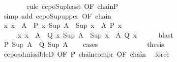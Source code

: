 \begin{isabellebody}
\ \ \ \ \ \ \isamarkupfalse%
\ {\isacharparenleft}{\kern0pt}rule\ ccpo{\isacharunderscore}{\kern0pt}Sup{\isacharunderscore}{\kern0pt}least\ {\isacharbrackleft}{\kern0pt}OF\ chain{\isacharunderscore}{\kern0pt}P{\isacharbrackright}{\kern0pt}{\isacharparenright}{\kern0pt}\isanewline
\ \ \ \ \ \ \isamarkupfalse%
\ {\isacharparenleft}{\kern0pt}simp\ add{\isacharcolon}{\kern0pt}\ ccpo{\isacharunderscore}{\kern0pt}Sup{\isacharunderscore}{\kern0pt}upper\ {\isacharbrackleft}{\kern0pt}OF\ chain{\isacharbrackright}{\kern0pt}{\isacharparenright}{\kern0pt}\isanewline
\ \ \ \ \ \ \isamarkupfalse%
\isanewline
\ \ \isamarkupfalse%
\isanewline
\ \ \isamarkupfalse%
\isanewline
\ \ \isamarkupfalse%
\ {\isachardoublequoteopen}{\isasymexists}x{\isachardot}{\kern0pt}\ x\ {\isasymin}\ A\ {\isasymand}\ P\ x{\isachardoublequoteclose}\ {\isachardoublequoteopen}Sup\ A\ {\isacharequal}{\kern0pt}\ Sup\ {\isacharbraceleft}{\kern0pt}x\ {\isasymin}\ A{\isachardot}{\kern0pt}\ P\ x{\isacharbraceright}{\kern0pt}{\isachardoublequoteclose}\isanewline
\ \ \ \ {\isacharbar}{\kern0pt}\ {\isachardoublequoteopen}{\isasymexists}x{\isachardot}{\kern0pt}\ x\ {\isasymin}\ A\ {\isasymand}\ Q\ x{\isachardoublequoteclose}\ {\isachardoublequoteopen}Sup\ A\ {\isacharequal}{\kern0pt}\ Sup\ {\isacharbraceleft}{\kern0pt}x\ {\isasymin}\ A{\isachardot}{\kern0pt}\ Q\ x{\isacharbraceright}{\kern0pt}{\isachardoublequoteclose}\isanewline
\ \ \ \ \isamarkupfalse%
\ blast\isanewline
\ \ \isamarkupfalse%
\ \isamarkupfalse%
\ {\isachardoublequoteopen}P\ {\isacharparenleft}{\kern0pt}Sup\ A{\isacharparenright}{\kern0pt}\ {\isasymor}\ Q\ {\isacharparenleft}{\kern0pt}Sup\ A{\isacharparenright}{\kern0pt}{\isachardoublequoteclose}\isanewline
\ \ \isamarkupfalse%
\ cases\isanewline
\ \ \ \ \isamarkupfalse%
\ {}\isanewline
\ \ \ \ \isamarkupfalse%
\ \isamarkupfalse%
\ {\isacharquery}{\kern0pt}thesis\isanewline
\ \ \ \ \ \ \isamarkupfalse%
\ ccpo{\isachardot}{\kern0pt}admissibleD\ {\isacharbrackleft}{\kern0pt}OF\ P\ chain{\isacharunderscore}{\kern0pt}compr\ {\isacharbrackleft}{\kern0pt}OF\ chain{\isacharbrackright}{\kern0pt}{\isacharbrackright}{\kern0pt}\ \isamarkupfalse%
\ force\isanewline
\ \ \isamarkupfalse%
\isanewline
\ \ \ \ \isamarkupfalse%
\ {}\isanewline
\ \ \ \ \isamarkupfalse%
\ \isamarkupfalse%

\end{isabellebody}
